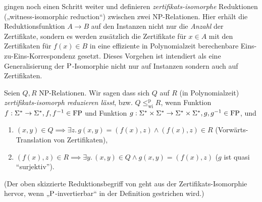 \textcite{wiedermann_witness-isomorphic_1995} gingen noch einen Schritt weiter und definieren \emph{zertifikats-isomorphe} Reduktionen („witness-isomorphic reduction“) zwischen zwei NP-Relationen. Hier erhält die Reduktionsfunktion $A\to B$ auf den Instanzen nicht nur die \emph{Anzahl} der Zertifikate, sondern es werden zusätzlich die Zertifikate für $x\in A$ mit den Zertifikaten für $f(x)\in B$ in eine effiziente in Polynomialzeit berechenbare Eins-zu-Eins-Korrespondenz gesetzt. Dieses Vorgehen ist intendiert als eine Generalisierung der $\P$-Isomorphie \parencite{berman_isomorphisms_1977} nicht nur auf Instanzen sondern auch auf Zertifikaten.

\begin{definition}\label{def:wi-reduction}
    Seien $Q, R$ NP-Relationen. Wir sagen dass sich $Q$ auf $R$ (in Polynomialzeit) \emph{zertifikats-isomorph reduzieren lässt}, bzw. $Q\leq_\mathrm{wi}^\mathrm p R$, wenn Funktion $f:\Sigma^*\to\Sigma^*, f, f^{-1}\in \FP$ und Funktion $g:\Sigma^*\times\Sigma^*\to\Sigma^*\times\Sigma^*, g, g^{-1}\in\FP$, und
    \begin{enumerate}
        \item $(x,y)\in Q \implies \exists z.\,g(x,y) = (f(x), z) \land (f(x), z)\in R$ (Vorwärts-Translation von Zertifikaten),
        \item $(f(x),z)\in R \implies \exists y.\, (x,y)\in Q\land g(x,y)=(f(x), z)$ ($g$ ist quasi “surjektiv”). \qedhere
    \end{enumerate}
\end{definition}
(Der oben skizzierte Reduktionsbegriff von \textcite{lynch_structure_1978} geht aus der Zertifikats-Isomorphie hervor, wenn „$\P$-invertierbar“ in der Definition gestrichen wird.)

